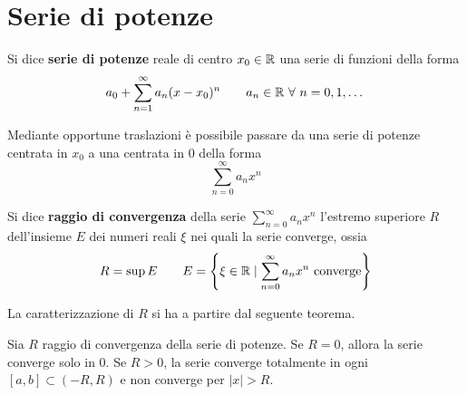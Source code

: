 \section{Serie di potenze}
\begin{definition}
Si dice \textbf{serie di potenze} reale di centro $x_0 \in \mathbb{R}$ una serie di funzioni della forma
\begin{equation}
    a_0+ \sum_{n=1}^{\infty}{a_n(x-x_0)^n} \qquad a_n \in \R\ \forall\ n=0,1,\dots
\end{equation}
\end{definition}
\begin{oss}
    Mediante opportune traslazioni è possibile passare da una serie di potenze centrata in $x_0$ a una centrata in $0$ della forma
    \begin{equation}
        \sum_{n=0}^{\infty}{a_n x^n}
    \end{equation}
\end{oss}
\begin{definition}
    Si dice \textbf{raggio di convergenza} della serie $\sum\limits_{n=0}^{\infty}{a_n x^n}$ l'estremo superiore $R$ dell'insieme $E$ dei numeri reali $\xi$ nei quali la serie converge, ossia
    \begin{equation}
        R= \sup E \qquad E=\left\{ \xi \in \R \mid \sum_{n=0}^{\infty}{a_n x^n}\ \text{converge}\right\}
    \end{equation}
\end{definition}
La caratterizzazione di $R$ si ha a partire dal seguente teorema.
\begin{theorem} \label{Teo: Caratterizzazione del raggio di convergenza}
    Sia $R$ raggio di convergenza della serie di potenze. Se $R=0$, allora la serie converge solo in $0$. Se $R>0$, la serie converge totalmente in ogni $[a,b] \subset (-R, R)$ e non converge per $|x|>R$.
\end{theorem}

